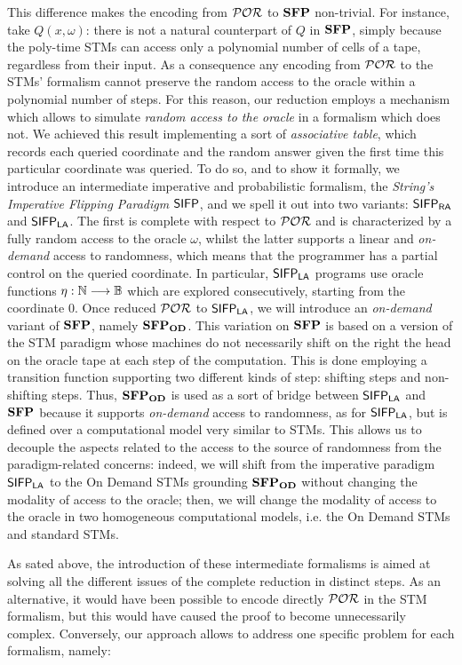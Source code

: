 This difference makes the encoding from $\mathcal{POR}$ to $\mathbf{SFP}$
non-trivial. For instance, take $Q(x, \omega)$:
there is not a natural counterpart of $Q$ in $\mathbf{SFP}$,
simply because the poly-time STMs
can access only a polynomial number of cells of a tape,
regardless from their input.
As a consequence any
encoding from $\mathcal{POR}$ to the STMs'
formalism cannot preserve the random access to
the oracle within a polynomial number of steps. For this reason, our reduction employs a mechanism which allows
to simulate \emph{random access to the oracle} in a formalism which does not.
We achieved this result implementing a sort of \emph{associative table}, which
records each queried coordinate and the random answer given
the first time this particular coordinate was queried. To do so, and to show it
formally, we introduce an intermediate imperative and probabilistic formalism, the \emph{String's Imperative Flipping Paradigm} $\mathsf{SIFP}$, and we
spell it out into two variants: $\mathsf{SIFP_{{\mathsf{RA}}}}$ and $\mathsf{SIFP_{{\mathsf{LA}}}}$. The first is complete with
respect to
$\mathcal{POR}$ and is characterized by a fully random access to the oracle $\omega$,
whilst the latter supports a linear and \emph{on-demand} access to randomness,
which means that the programmer has a partial control on the queried coordinate.
In particular, $\mathsf{SIFP_{{\mathsf{LA}}}}$ programs use oracle
functions $\eta: \mathbb{N} \longrightarrow \mathbb{B}$ which are explored consecutively,
starting from the coordinate $0$.
%
Once reduced $\mathcal{POR}$ to $\mathsf{SIFP_{{\mathsf{LA}}}}$, we will introduce an \emph{on-demand} variant
of $\mathbf{SFP}$, namely $\mathbf{SFP_{\mathbf{OD}}}$. This variation on $\mathbf{SFP}$ is based on a version
of the STM paradigm whose machines
do not necessarily
shift on the right the head on the oracle tape at each step of the computation.
This is done employing a transition function supporting two different kinds of
step: shifting steps and non-shifting steps. Thus,
$\mathbf{SFP_{\mathbf{OD}}}$ is used as a sort of bridge between $\mathsf{SIFP_{{\mathsf{LA}}}}$
and $\mathbf{SFP}$ because it supports \emph{on-demand} access to randomness, as for
$\mathsf{SIFP_{{\mathsf{LA}}}}$, but is defined over a computational model very similar to STMs.
This allows us to decouple the aspects related to the
access to the source of randomness from the paradigm-related concerns:
indeed, we will shift from the imperative paradigm $\mathsf{SIFP_{{\mathsf{LA}}}}$ to the On Demand STMs
grounding $\mathbf{SFP_{\mathbf{OD}}}$
without changing the modality of access to the oracle; then, we will change the
modality of access to the oracle in two homogeneous computational models, i.e. the
On Demand STMs and standard STMs.

As sated above, the introduction of these intermediate formalisms is aimed
at solving all the different issues of the complete reduction in distinct
steps. As an alternative, it would have been possible to encode directly
$\mathcal{POR}$ in the STM formalism,
but this would have caused the proof to become unnecessarily complex.
Conversely, our approach allows to address one specific problem for each formalism, namely:

